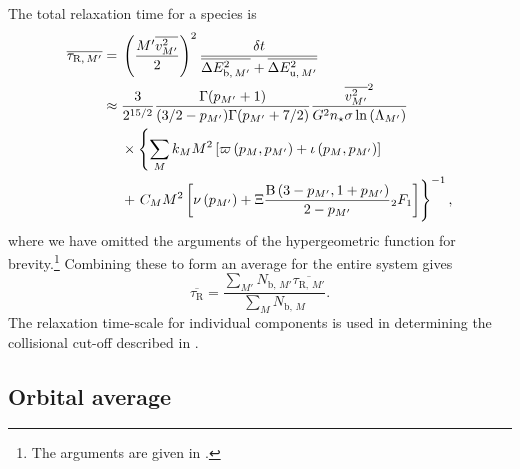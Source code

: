 The total relaxation time for a species is
\begin{align}
\overline{\tau_{\mathrm{R,}\,M'}} = {} & \left(\dfrac{{M'}\overline{v_{M'}^2}}{2}\right)^2\dfrac{\delta t}{\overline{\Delta E^2_{\mathrm{b},\,M'}} + \overline{\Delta E^2_{\mathrm{u},\,M'}}} \\
 \approx {} & \dfrac{3}{2^{15/2}}\dfrac{\Gamma(p_{M'} + 1)}{(3/2 - p_{M'})\Gamma(p_{M'} + 7/2)}\dfrac{\overline{v_{M'}^2}^2}{G^2n_\star\sigma\ln\left(\Lambda_{M'}\right)} \nonumber \\* 
 {} & \times \left\{\sum_M k_M M^2 \left[ \varpi\left(p_M,p_{M'}\right) + \iota \left(p_M,p_{M'}\right)\right] \right. \nonumber \\*
 {} & + \left. \vphantom{ \left[ \dfrac{p_{M'}^2\left(6 + 9p_M + 8p_M^2\right)}{210}\right]} C_M M^2 \left[\nu\left(p_{M'}\right) + \Xi\dfrac{\Beta\left(3-p_{M'},1+p_{M'}\right)}{2-p_{M'}}{_2F_1}%
 \right]\right\}^{-1},
\end{align}
where we have omitted the arguments of the hypergeometric function for brevity.\footnote{The arguments are given in .} Combining these to form an average for the entire system gives
\begin{equation}
\overline{\tau_{\mathrm{R}}} = \dfrac{\sum_{M'}N_{\mathrm{b,}\,M'}\overline{\tau_{\mathrm{R,}\,M'}}}{\sum_{M}N_{\mathrm{b,}\,M}}.
\label{eq:system-relax}
\end{equation}
The relaxation time-scale for individual components is used in determining the collisional cut-off described in .

\subsection{Orbital average}\label{sec:orbital-ave}

